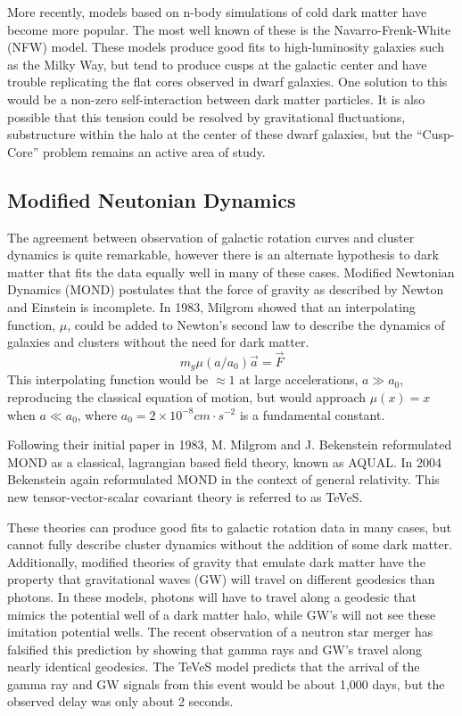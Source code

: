 More recently, models based on n-body simulations of cold dark matter have become more popular. The most well known of these is the Navarro-Frenk-White (NFW) model. These models produce good fits to high-luminosity galaxies such as the Milky Way, but tend to produce cusps at the galactic center and have trouble replicating the flat cores observed in dwarf galaxies. One solution to this would be a non-zero self-interaction between dark matter particles. It is also possible that this tension could be resolved by gravitational fluctuations, substructure within the halo at the center of these dwarf galaxies, but the ``Cusp-Core'' problem remains an active area of study\cite{weber, navarro}.




\subsection{Modified Neutonian Dynamics}

The agreement between observation of galactic rotation curves and cluster dynamics is quite remarkable, however there is an alternate hypothesis to dark matter that fits the data equally well in many of these cases. Modified Newtonian Dynamics (MOND) postulates that the force of gravity as described by Newton and Einstein is incomplete. In 1983, Milgrom showed that an interpolating function, $\mu$, could be added to Newton's second law to describe the dynamics of galaxies and clusters without the need for dark matter.
\begin{equation}\label{eq:interp_func}
m_{g}\mu(a/a_{0})\vec{a}=\vec{F}
\end{equation}
This interpolating function would be $\approx 1$ at large accelerations, $a\gg a_{0}$, reproducing the classical equation of motion, but would approach $\mu(x)=x$ when $a\ll a_{0}$, where $a_{0}=2 \times 10^{-8} cm\cdot s^{-2}$ is a fundamental constant\cite{milgrom, bekenstein}. 

Following their initial paper in 1983, M. Milgrom and J. Bekenstein reformulated MOND as a classical, lagrangian based field theory, known as AQUAL. In 2004 Bekenstein again reformulated MOND in the context of general relativity. This new tensor-vector-scalar covariant theory is referred to as TeVeS\cite{bekenstein}. 

These theories can produce good fits to galactic rotation data in many cases, but cannot fully describe cluster dynamics without the addition of some dark matter\cite{bekenstein, chaichiana}. Additionally, modified theories of gravity that emulate dark matter have the property that gravitational waves (GW) will travel on different geodesics than photons. In these models, photons will have to travel along a geodesic that mimics the potential well of a dark matter halo, while GW's will not see these imitation potential wells. The recent observation of a neutron star merger has falsified this prediction by showing that gamma rays and GW's travel along nearly identical geodesics. The TeVeS model predicts that the arrival of the gamma ray and GW signals from this event would be about 1,000 days, but the observed delay was only about 2 seconds\cite{teves_false}.



